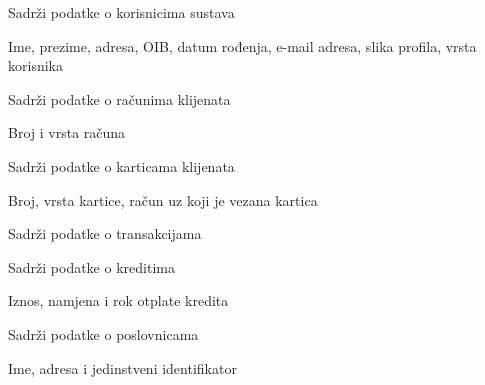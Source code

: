 \begin{packed_enum}
\begin{packed_enum}
					\item Sadrži podatke o korisnicima sustava
					\begin{packed_enum}
						\item Ime, prezime, adresa, OIB, datum rođenja, e-mail adresa, slika profila, vrsta korisnika
					\end{packed_enum}
					\item Sadrži podatke o računima klijenata
					\begin{packed_enum}
						\item Broj i vrsta računa
					\end{packed_enum}
					\item Sadrži podatke o karticama klijenata
					\begin{packed_enum}
						\item Broj, vrsta kartice, račun uz koji je vezana kartica
					\end{packed_enum}
					\item Sadrži podatke o transakcijama
					\item Sadrži podatke o kreditima
					\begin{packed_enum}
						\item Iznos, namjena i rok otplate kredita
					\end{packed_enum}
					\item Sadrži podatke o poslovnicama
					\begin{packed_enum}
						\item Ime, adresa i jedinstveni identifikator
					\end{packed_enum}
					
				\end{packed_enum}
				
				\item	{}
				
				\begin{packed_enum}
					

\end{packed_enum}
\end{packed_enum}
